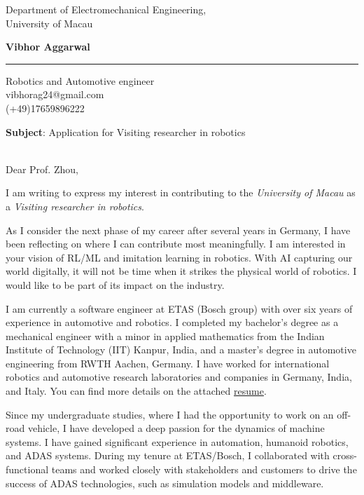 \documentclass[a4paper,10 pt]{letter} %
\date{\today} %
\begin{document}
\renewcommand{\enclname}{Enclosed}
\longindentation=0pt                       %
\let\raggedleft\raggedright                %


\begin{letter}
{Department of Electromechanical Engineering, \\
University of Macau
}
\begin{center}
{\large\bf Vibhor Aggarwal}
\end{center}
\medskip\hrule height 1pt
\begin{center}
{Robotics and Automotive engineer  \\  vibhorag24@gmail.com\\ (+49)17659896222}
\end{center} \vfill %

\textbf{Subject}: Application for Visiting researcher in robotics \\ \\
\opening{Dear Prof. Zhou,}

I am writing to express my interest in contributing to the \textit{University of Macau} as a \textit{Visiting researcher in robotics}.

As I consider the next phase of my career after several years in Germany, I have been reflecting on where I can contribute most meaningfully. I am interested in your vision of RL/ML and imitation learning in robotics. With AI capturing our world digitally, it will not be time when it strikes the physical world of robotics. I would like to be part of its impact on the industry.

I am currently a software engineer at ETAS (Bosch group) with over six years of experience in automotive and robotics. I completed my bachelor's degree as a mechanical engineer with a minor in applied mathematics from the Indian Institute of Technology (IIT) Kanpur, India, and a master's degree in automotive engineering from RWTH Aachen, Germany. I have worked for international robotics and automotive research laboratories and companies in Germany, India, and Italy. You can find more details on the attached \href{https://vibhoraggarwal.github.io/files/VibhorResume_en.pdf}{resume}.

Since my undergraduate studies, where I had the opportunity to work on an off-road vehicle, I have developed a deep passion for the dynamics of machine systems. I have gained significant experience in automation, humanoid robotics, and ADAS systems. During my tenure at ETAS/Bosch, I collaborated with cross-functional teams and worked closely with stakeholders and customers to drive the success of ADAS technologies, such as simulation models and middleware.


\end{letter}
\end{document}
